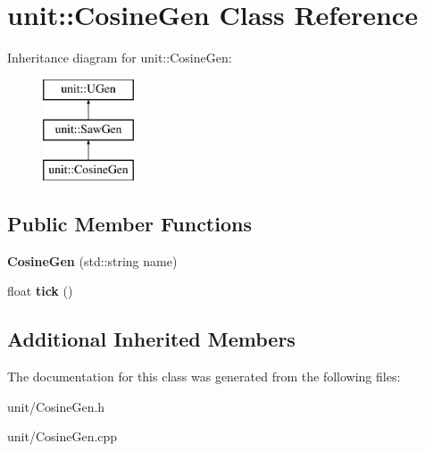 \hypertarget{classunit_1_1CosineGen}{}\section{unit\+:\+:Cosine\+Gen Class Reference}
\label{classunit_1_1CosineGen}
Inheritance diagram for unit\+:\+:Cosine\+Gen\+:\begin{figure}[H]
\begin{center}
\leavevmode
\includegraphics[height=3.000000cm]{classunit_1_1CosineGen}
\end{center}
\end{figure}
\subsection*{Public Member Functions}
\begin{DoxyCompactItemize}
\item 
{\bfseries Cosine\+Gen} (std\+::string name)\hypertarget{classunit_1_1CosineGen_a1eb4aa0471f337e95653d91e550f58cb}{}\label{classunit_1_1CosineGen_a1eb4aa0471f337e95653d91e550f58cb}

\item 
float {\bfseries tick} ()\hypertarget{classunit_1_1CosineGen_a4c1ceffaf70b5eae5c4153ee4b93c001}{}\label{classunit_1_1CosineGen_a4c1ceffaf70b5eae5c4153ee4b93c001}

\end{DoxyCompactItemize}
\subsection*{Additional Inherited Members}


The documentation for this class was generated from the following files\+:\begin{DoxyCompactItemize}
\item 
unit/Cosine\+Gen.\+h\item 
unit/Cosine\+Gen.\+cpp\end{DoxyCompactItemize}
